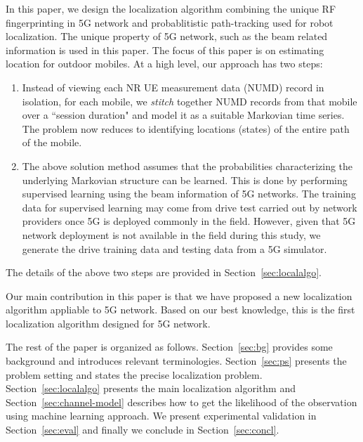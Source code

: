 \documentclass[conference, 10pt]{IEEEtran}
\begin{document}

In this paper, we design the localization algorithm combining the unique RF 
fingerprinting in 5G network and probablitistic path-tracking used for robot localization. The unique property of 5G network, such as the beam related 
information is used in this paper. The focus of this paper is on estimating location for outdoor mobiles. 
At a high level, our approach has two steps:

\begin{enumerate}
    \item Instead of viewing each NR UE measurement data (NUMD) record in isolation, for each mobile, we {\em stitch}
together NUMD records from that mobile over a ``session
duration"  and model it as a suitable Markovian time series. The problem now
reduces to identifying locations (states) of the entire path of
the mobile.

\item The above solution method assumes that the probabilities characterizing the
underlying Markovian structure can be learned. This is done by performing supervised learning using the beam information of 5G networks.
The training data for supervised learning may come from
drive test carried out by network providers once 5G is deployed commonly in the field. However, given that 5G network deployment is not available in the field during this study, we generate the drive training data and testing data from a 5G simulator.
	
\end{enumerate}

The details of the above two steps are provided in Section~\ref{sec:localalgo}.


Our main contribution in this paper is that we have proposed a new localization algorithm
appliable to 5G network. Based on our best knowledge, this is the first localization algorithm designed for 5G network. 


The rest of the paper is organized as follows. Section~\ref{sec:bg} provides some
background and introduces relevant terminologies. Section~\ref{sec:ps} presents
the problem setting and states the precise localization problem.
Section~\ref{sec:localalgo}
presents the main localization algorithm and Section~\ref{sec:channel-model} describes how to get the likelihood of the observation using machine learning approach. 
We present experimental validation in Section~\ref{sec:eval} and finally we conclude in
Section~\ref{sec:concl}.
\end{document}
